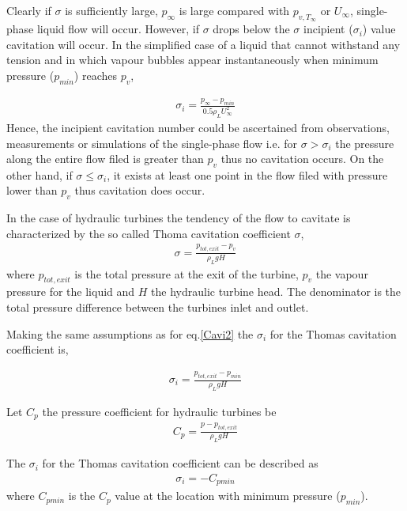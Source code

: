 Clearly if $\sigma$ is sufficiently large, $p_{\infty}$ is large compared with $p_{v,T_{\infty}}$ or $U_{\infty}$, single-phase liquid flow will occur. However, if $\sigma$ drops below the $\sigma$ incipient ($\sigma_i$) value cavitation will occur. In the simplified case of a liquid that cannot withstand any tension and in which vapour bubbles appear instantaneously when minimum pressure ($p_{min}$) reaches $p_{v}$,

\begin{eqnarray}
		\sigma_i=\frac{p_{\infty}-p_{min}}{0.5\rho_{L}U^2_{\infty}}
\label{Cavi2}
\end{eqnarray}
Hence, the incipient cavitation number could be ascertained from observations, measurements or simulations of the single-phase flow i.e. for $\sigma > \sigma_i$ the pressure along the entire flow filed is greater than $p_v$ thus no cavitation occurs. On the other hand, if $\sigma \leq \sigma_i$, it exists at least one point in the flow filed with pressure lower than $p_v$ thus cavitation does occur. 


In the case of hydraulic turbines the tendency of the flow to cavitate is characterized by the so called Thoma cavitation coefficient $\sigma$, 
\begin{eqnarray}
		\sigma=\frac{p_{tot,exit}-p_{v}}{\rho_{L}gH}
\label{Cavi3}
\end{eqnarray}
where $p_{tot,exit}$ is the total pressure at the exit of the turbine, $p_v$ the vapour pressure for the liquid and $H$ the hydraulic turbine head. The denominator is the total pressure difference between the turbines inlet and outlet.   

Making the same assumptions as for eq.\ref{Cavi2} the $\sigma_i$ for the Thomas cavitation coefficient  is, 

\begin{eqnarray}
		\sigma_i=\frac{p_{tot,exit}-p_{min}}{\rho_{L}gH}
\label{Cavi4}
\end{eqnarray}

Let $C_p$ the pressure coefficient for hydraulic turbines be 
\begin{eqnarray}
		C_p=\frac{p-p_{tot,exit}}{\rho_{L}gH}
\label{Cpdef}
\end{eqnarray}

The $\sigma_i$ for the Thomas cavitation coefficient can be described as 
\begin{eqnarray}
		\sigma_i=-C_{pmin}
\label{Cavi6}
\end{eqnarray}
where $C_{pmin}$ is the $C_p$ value at the location with minimum pressure ($p_{min}$).

